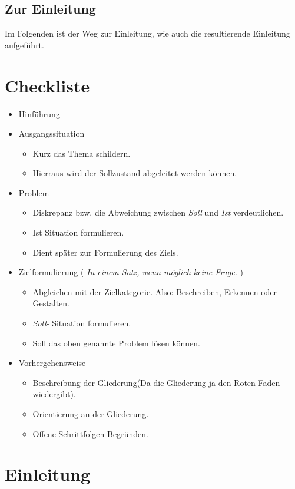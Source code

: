 \section{Zur Einleitung}
Im Folgenden ist der Weg zur Einleitung, wie auch die resultierende Einleitung aufgeführt.
\chapter{Checkliste}


\begin{itemize}
\item Hinführung
\item Ausgangssituation
\begin{itemize}
	\item Kurz das Thema schildern.
	\item Hierraus wird der Sollzustand abgeleitet werden können.
\end{itemize}
\item Problem 
\begin{itemize}
	\item Diskrepanz bzw. die Abweichung zwischen \textit{Soll} und \textit{Ist} 						verdeutlichen.
	\item Ist Situation formulieren. 
	\item Dient später zur Formulierung des Ziels.
\end{itemize}
\item Zielformulierung ( \textit{In einem Satz, wenn möglich keine Frage.} )
\begin{itemize}
	\item Abgleichen mit der Zielkategorie. Also: Beschreiben, Erkennen oder Gestalten.
	\item \textit{Soll}- Situation formulieren.
	\item Soll das oben genannte Problem lösen können. 
\end{itemize}
\item Vorhergehensweise
\begin{itemize}
	\item Beschreibung der Gliederung(Da die Gliederung ja den Roten Faden wiedergibt).
	\item Orientierung an der Gliederung.
	\item Offene Schrittfolgen Begründen.
\end{itemize}
\end{itemize}



\chapter{Einleitung}
